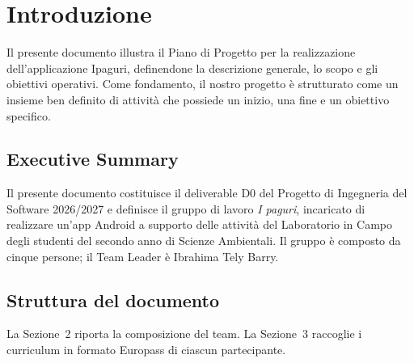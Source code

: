 \section{Introduzione}
Il presente documento illustra il Piano di Progetto per la realizzazione dell'applicazione Ipaguri, 
definendone la descrizione generale, lo scopo e gli obiettivi operativi. Come fondamento, il nostro progetto 
è strutturato come un insieme ben definito di attività che possiede un inizio, una fine e un obiettivo specifico.
\subsection{Executive Summary}
Il presente documento costituisce il deliverable D0 del Progetto di Ingegneria del Software 2026/2027
e definisce il gruppo di lavoro \emph{I paguri}, incaricato di realizzare un'app Android a supporto
delle attività del Laboratorio in Campo degli studenti del secondo anno di Scienze Ambientali.
Il gruppo è composto da cinque persone; il Team Leader è Ibrahima Tely Barry.


\subsection{Struttura del documento}
La Sezione~2 riporta la composizione del team. La Sezione~3 raccoglie i curriculum
in formato Europass di ciascun partecipante.
